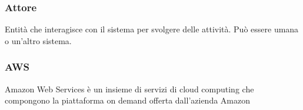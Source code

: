 \subsubsection*{Attore}
Entità che interagisce con il sistema per svolgere delle attività. Può essere umana o un'altro sistema.

\subsubsection*{AWS}
Amazon Web Services è un insieme di servizi di cloud computing che compongono la piattaforma on demand offerta dall'azienda Amazon

